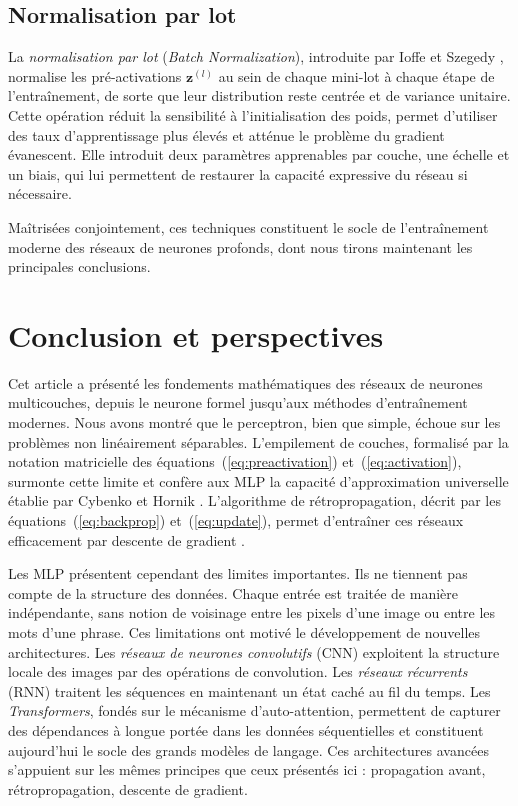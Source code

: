 \documentclass[a4paper,french]{style-LaTeX}
\begin{document}
\subsection*{Normalisation par lot}

La \emph{normalisation par lot} (\emph{Batch Normalization}), introduite par Ioffe et Szegedy \cite{BatchNorm15}, normalise les pré-activations $\mathbf{z}^{(l)}$ au sein de chaque mini-lot à chaque étape de l'entraînement, de sorte que leur distribution reste centrée et de variance unitaire. Cette opération réduit la sensibilité à l'initialisation des poids, permet d'utiliser des taux d'apprentissage plus élevés et atténue le problème du gradient évanescent. Elle introduit deux paramètres apprenables par couche, une échelle et un biais, qui lui permettent de restaurer la capacité expressive du réseau si nécessaire.

Maîtrisées conjointement, ces techniques constituent le socle de l'entraînement moderne des réseaux de neurones profonds, dont nous tirons maintenant les principales conclusions.


\section{Conclusion et perspectives}

Cet article a présenté les fondements mathématiques des réseaux de neurones multicouches, depuis le neurone formel jusqu'aux méthodes d'entraînement modernes. Nous avons montré que le perceptron, bien que simple, échoue sur les problèmes non linéairement séparables. L'empilement de couches, formalisé par la notation matricielle des équations~(\ref{eq:preactivation}) et~(\ref{eq:activation}), surmonte cette limite et confère aux MLP la capacité d'approximation universelle établie par Cybenko \cite{Cybenko89} et Hornik \cite{Hornik91}. L'algorithme de rétropropagation, décrit par les équations~(\ref{eq:backprop}) et~(\ref{eq:update}), permet d'entraîner ces réseaux efficacement par descente de gradient \cite{Rumelhart86}.

Les MLP présentent cependant des limites importantes. Ils ne tiennent pas compte de la structure des données. Chaque entrée est traitée de manière indépendante, sans notion de voisinage entre les pixels d'une image ou entre les mots d'une phrase. Ces limitations ont motivé le développement de nouvelles architectures. Les \emph{réseaux de neurones convolutifs} (CNN) exploitent la structure locale des images par des opérations de convolution. Les \emph{réseaux récurrents} (RNN) traitent les séquences en maintenant un état caché au fil du temps. Les \emph{Transformers}, fondés sur le mécanisme d'auto-attention, permettent de capturer des dépendances à longue portée dans les données séquentielles et constituent aujourd'hui le socle des grands modèles de langage. Ces architectures avancées s'appuient sur les mêmes principes que ceux présentés ici : propagation avant, rétropropagation, descente de gradient.
\end{document}
